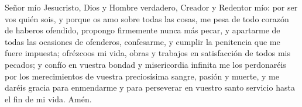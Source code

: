 \documentclass[../devocionario.tex]{subfiles}
\begin{document}
    Señor mío Jesucristo, Dios y Hombre verdadero, Creador y Redentor mío: por ser vos quién sois, y porque os amo sobre todas las cosas, 
    me pesa de todo corazón de haberos ofendido, propongo firmemente nunca más pecar, y apartarme de todas las ocasiones de ofenderos, 
    confesarme, y cumplir la penitencia que me fuere impuesta; ofrézcoos mi vida, obras y trabajos en satisfacción de todos mis pecados; 
    y confío en vuestra bondad y misericordia infinita me los perdonaréis por los merecimientos de vuestra preciosísima sangre, pasión y muerte, 
    y me daréis gracia para enmendarme y para perseverar en vuestro santo servicio hasta el fin de mi vida. Amén.
\end{document}
